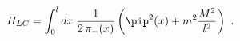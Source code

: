 \begin{equation}
    H_{LC} = \int_0^l dx\; \frac{1}{2 \, \pi_- (x)}
    \left(\pip^2 (x) + m^2 \frac{M^2}{l^2} \right) \ .
\end{equation}

